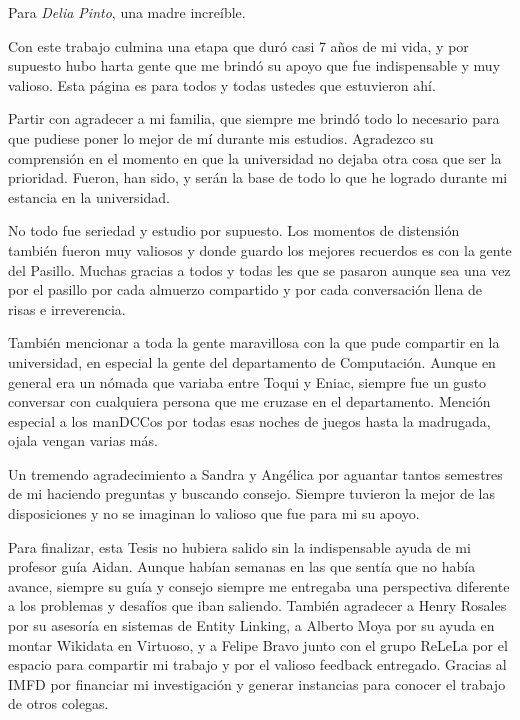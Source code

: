 \documentclass[upright, contnum]{umemoria}
\begin{document}
\begin{dedicatoria} %
Para \emph{Delia Pinto}, una madre increíble.
\end{dedicatoria}

\begin{thanks} %
Con este trabajo culmina una etapa que duró casi 7 años de mi vida, y por supuesto hubo harta gente 
que me brindó su apoyo que fue indispensable y muy valioso. Esta página es para todos y todas ustedes 
que estuvieron ahí. 

Partir con agradecer a mi familia, que siempre me brindó todo lo necesario para que pudiese poner lo 
mejor de mí durante mis estudios. Agradezco su comprensión en el momento en que la universidad no 
dejaba otra cosa que ser la prioridad. Fueron, han sido, y serán la base de todo lo que he logrado 
durante mi estancia en la universidad.

No todo fue seriedad y estudio por supuesto. Los momentos de distensión también fueron muy valiosos y 
donde guardo los mejores recuerdos es con la gente del Pasillo. Muchas gracias a todos y todas les 
que se pasaron aunque sea una vez por el pasillo por cada almuerzo compartido y por cada conversación 
llena de risas e irreverencia.

También mencionar a toda la gente maravillosa con la que pude compartir en la universidad, en especial 
la gente del departamento de Computación. Aunque en general era un nómada que variaba entre Toqui y 
Eniac, siempre fue un gusto conversar con cualquiera persona que me cruzase en el departamento. 
Mención especial a los manDCCos por todas esas noches de juegos hasta la madrugada, ojala vengan 
varias más.

Un tremendo agradecimiento a Sandra y Angélica por aguantar tantos semestres de mi haciendo preguntas 
y buscando consejo. Siempre tuvieron la mejor de las disposiciones y no se imaginan lo valioso que 
fue para mi su apoyo.

Para finalizar, esta Tesis no hubiera salido sin la indispensable ayuda de mi profesor guía Aidan. 
Aunque habían semanas en las que sentía que no había avance, siempre su guía y consejo siempre me 
entregaba una perspectiva diferente a los problemas y desafíos que iban saliendo. También agradecer a 
Henry Rosales por su asesoría en sistemas de Entity Linking, a Alberto Moya por su ayuda en montar 
Wikidata en Virtuoso, y a Felipe Bravo junto con el grupo ReLeLa por el espacio para compartir mi 
trabajo y por el valioso feedback entregado. Gracias al IMFD por financiar mi investigación y generar 
instancias para conocer el trabajo de otros colegas.
    
\end{thanks}
\cleardoublepage
\end{document}
